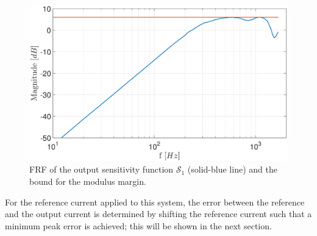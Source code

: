 \documentclass[journal]{IEEEtran}
\begin{document}
{%

\begin{figure}
\centering
\includegraphics[width=\columnwidth]{pics_prbs/sens_S0.eps}
\caption{FRF of the output sensitivity function $\mathcal{S}_1$ (solid-blue line) and the bound for the modulus margin.}
\label{fig:sens_freq}
\end{figure}

For the reference current applied to this system, the error between the reference and the output current is determined by shifting the reference current such that a minimum peak error is achieved; this will be shown in the next section.


}
\end{document}
